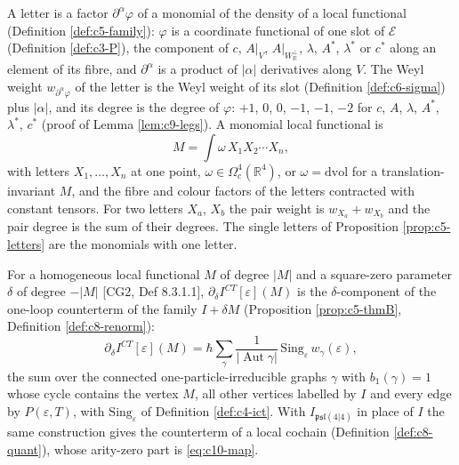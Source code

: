 \begin{definition}
\label{def:c10-letters}
A letter is a factor $\partial^\alpha\varphi$ of a monomial of the density of a local functional (Definition \ref{def:c5-family}): $\varphi$ is a coordinate functional of one slot of $\mathscr E$ (Definition \ref{def:c3-P}), the component of $c$, $A|_V$, $A|_{W_{\mathbb R}^\perp}$, $\lambda$, $A^*$, $\lambda^*$ or $c^*$ along an element of its fibre, and $\partial^\alpha$ is a product of $|\alpha|$ derivatives along $V$. The Weyl weight $w_{\partial^\alpha\varphi}$ of the letter is the Weyl weight of its slot (Definition \ref{def:c6-sigma}) plus $|\alpha|$, and its degree is the degree of $\varphi$: $+1$, $0$, $0$, $-1$, $-1$, $-2$ for $c$, $A$, $\lambda$, $A^*$, $\lambda^*$, $c^*$ (proof of Lemma \ref{lem:c9-legs}). A monomial local functional is
\[
M=\int\omega\,X_1X_2\cdots X_n,
\]
with letters $X_1,\dots,X_n$ at one point, $\omega\in\Omega^4_c(\mathbb R^4)$, or $\omega=\mathrm{dvol}$ for a translation-invariant $M$, and the fibre and colour factors of the letters contracted with constant tensors. For two letters $X_a$, $X_b$ the pair weight is $w_{X_a}+w_{X_b}$ and the pair degree is the sum of their degrees. The single letters of Proposition \ref{prop:c5-letters} are the monomials with one letter.
\end{definition}

For a homogeneous local functional $M$ of degree $|M|$ and a square-zero parameter $\delta$ of degree $-|M|$ [CG2, Def 8.3.1.1], $\partial_\delta I^{CT}[\varepsilon](M)$ is the $\delta$-component of the one-loop counterterm of the family $I+\delta M$ (Proposition \ref{prop:c5-thmB}, Definition \ref{def:c8-renorm}):
\begin{equation}
\partial_\delta I^{CT}[\varepsilon](M)=\hbar\sum_\gamma\frac1{|\operatorname{Aut}\gamma|}\,\mathrm{Sing}_\varepsilon\,w_\gamma(\varepsilon),
\label{eq:c10-map}
\end{equation}
the sum over the connected one-particle-irreducible graphs $\gamma$ with $b_1(\gamma)=1$ whose cycle contains the vertex $M$, all other vertices labelled by $I$ and every edge by $P(\varepsilon,T)$, with $\mathrm{Sing}_\varepsilon$ of Definition \ref{def:c4-ict}. With $I_{\mathfrak{psl}(4|4)}$ in place of $I$ the same construction gives the counterterm of a local cochain (Definition \ref{def:c8-quant}), whose arity-zero part is \eqref{eq:c10-map}.

